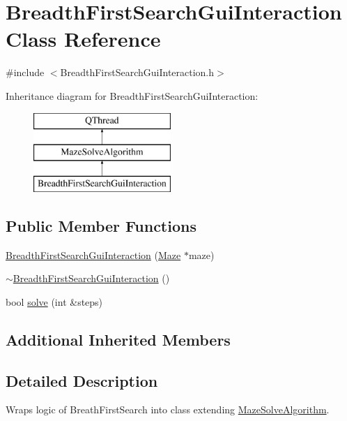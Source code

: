 \hypertarget{class_breadth_first_search_gui_interaction}{\section{Breadth\-First\-Search\-Gui\-Interaction Class Reference}
\label{class_breadth_first_search_gui_interaction}
}


{\ttfamily \#include $<$Breadth\-First\-Search\-Gui\-Interaction.\-h$>$}

Inheritance diagram for Breadth\-First\-Search\-Gui\-Interaction\-:\begin{figure}[H]
\begin{center}
\leavevmode
\includegraphics[height=3.000000cm]{class_breadth_first_search_gui_interaction}
\end{center}
\end{figure}
\subsection*{Public Member Functions}
\begin{DoxyCompactItemize}
\item 
\hyperlink{class_breadth_first_search_gui_interaction_a32769d981f2a07be1608288bfdb96efc}{Breadth\-First\-Search\-Gui\-Interaction} (\hyperlink{class_maze}{Maze} $\ast$maze)
\item 
\hyperlink{class_breadth_first_search_gui_interaction_a0277493bfd3ce130c0e95b3d841d8f9c}{$\sim$\-Breadth\-First\-Search\-Gui\-Interaction} ()
\item 
bool \hyperlink{class_breadth_first_search_gui_interaction_ad76cbe94351cb0d25fcf5d43468074e4}{solve} (int \&steps)
\end{DoxyCompactItemize}
\subsection*{Additional Inherited Members}


\subsection{Detailed Description}
Wraps logic of Breath\-First\-Search into class extending \hyperlink{class_maze_solve_algorithm}{Maze\-Solve\-Algorithm}. 

